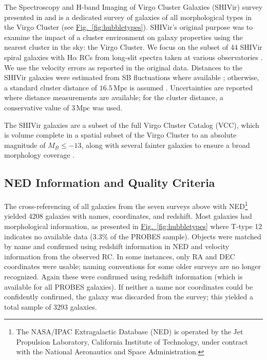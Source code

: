 \documentclass[twocolumn]{aastex631}
\newcommand{\Fig}[1]{{\protect\hyperref[fig:#1]{Fig.~\ref*{fig:#1}}}}
\newcommand{\Ha}{H\ensuremath{\alpha}\xspace}
\newcommand{\wunits}[2]{\ensuremath{#1\,\text{#2}}}
\newcommand{\probesdirty}{4208\xspace}
\newcommand{\probesnedmatched}{3293\xspace}
\begin{document}
The Spectroscopy and H-band Imaging of Virgo Cluster Galaxies (SHIVir) survey presented in \citet{Ouellette2017} and \citet{Ouellette2022} is a dedicated survey of galaxies of all morphological types in the Virgo Cluster (see \Fig{hubbletypes}).
SHIVir's original purpose was to examine the impact of a cluster environment on galaxy properties using the nearest cluster in the sky: the Virgo Cluster. 
We focus on the subset of 44 SHIVir spiral galaxies with \Ha RCs from long-slit spectra taken at various observatories \citep{Ouellette2017}.
We use the velocity errors as reported in the original data.
Distances to the SHIVir galaxies were estimated from SB fluctuations where available \citep{Jerjen2004,Blakeslee2009}; otherwise, a standard cluster distance of \wunits{16.5}{Mpc} is assumed \citep{Mei2007}. 
Uncertainties are reported where distance measurements are available; for the cluster distance, a conservative value of \wunits{3}{Mpc} was used.

The SHIVir galaxies are a subset of the full Virgo Cluster Catalog (VCC), which is volume complete in a spatial subset of the Virgo Cluster to an absolute magnitude of $M_B \leq -13$, along with several fainter galaxies to ensure a broad morphology coverage \citep{Binggeli1985,McDonald2011}.

\subsection{NED Information and Quality Criteria}\label{sec:neddata}

The cross-referencing of all galaxies from the seven surveys above with NED\footnote{The NASA/IPAC Extragalactic Database (NED) is operated by the Jet Propulsion Laboratory, California Institute of Technology, under contract with the National Aeronautics and Space Administration.} yielded \probesdirty galaxies with names, coordinates, and redshift.  
Most galaxies had morphological information, as presented in \Fig{hubbletypes} where T-type 12 indicates no available data (3.3\% of the PROBES sample).
Objects were matched by name and confirmed using redshift information in NED and velocity information from the observed RC.
In some instances, only RA and DEC coordinates were usable; naming conventions for some older surveys are no longer recognized. 
Again these were confirmed using redshift information (which is available for all PROBES galaxies).
If neither a name nor coordinates could be confidently confirmed, the galaxy was discarded from the survey; 
this yielded a total sample of \probesnedmatched galaxies.
\end{document}
